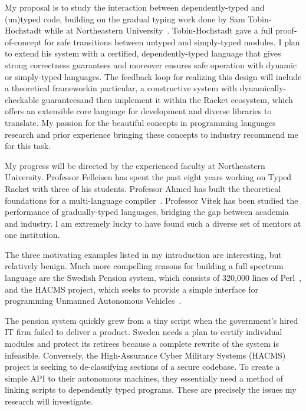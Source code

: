 \documentclass[12pt]{article}
\newcommand{\hdr}[2]{\vspace{-0.4cm}{\flushleft{\hrulefill\\\textbf{#1}\hfill{#2}\\\vspace{-0.2cm}\hrulefill}}\vspace{0.1cm}}
\begin{document}
My proposal is to study the interaction between dependently-typed and (un)typed code, building on the gradual typing work done by Sam Tobin-Hochstadt while at Northeastern University~\cite{tobin2010typed}.
Tobin-Hochstadt gave a full proof-of-concept for safe transitions between untyped and simply-typed modules.
I plan to extend his system with a certified, dependently-typed language that gives strong correctness guarantees and moreover ensures safe operation with dynamic or simply-typed languages.
The feedback loop for realizing this design will include a theoretical framework\textemdash in particular, a constructive system with dynamically-checkable guarantees\textemdash and then implement it within the Racket ecosystem, which offers an extensible core language for development and diverse libraries to translate.
My passion for the beautiful concepts in programming languages research and prior experience bringing these concepts to industry recommend me for this task.

My progress will be directed by the experienced faculty at Northeastern University.
Professor Felleisen has spent the past eight years working on Typed Racket with three of his students.
Professor Ahmed has built the theoretical foundations for a multi-language compiler~\cite{perconti2014verifying}.
Professor Vitek has been studied the performance of gradually-typed languages, bridging the gap between academia and industry.
I am extremely lucky to have found such a diverse set of mentors at one institution.

\newpage

\hdr{Broader Impacts}{}

The three motivating examples listed in my introduction are interesting, but relatively benign.
Much more compelling reasons for building a full spectrum language are the Swedish Pension system, which consists of 320,000 lines of Perl~\cite{jantalk}, and the HACMS project, which seeks to provide a simple interface for programming Unmanned Autonomous Vehicles~\cite{hacms}.

The pension system quickly grew from a tiny script when the government's hired IT firm failed to deliver a product.
Sweden needs a plan to certify individual modules and protect its retirees because a complete rewrite of the system is infeasible.
Conversely, the High-Assurance Cyber Military Systems (HACMS) project is seeking to de-classifying sections of a secure codebase.
To create a simple API to their autonomous machines, they essentially need a method of linking scripts to dependently typed programs.
These are precisely the issues my research will investigate.
\end{document}
